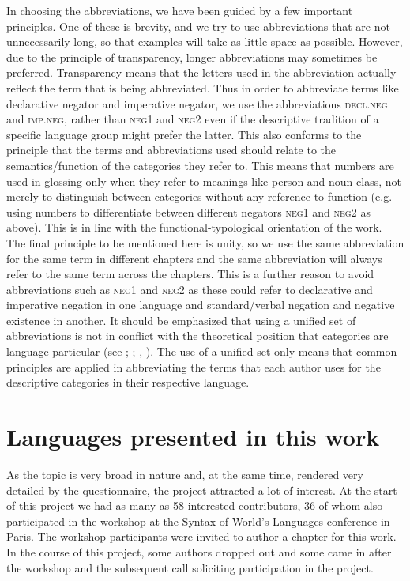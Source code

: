 \documentclass[output=paper,colorlinks,citecolor=brown]{langscibook}
\begin{document}
In choosing the abbreviations, we have been guided by a few important principles. One of these is brevity, and we try to use abbreviations that are not unnecessarily long, so that examples will take as little space as possible. However, due to the principle of transparency, longer abbreviations may sometimes be preferred. Transparency means that the letters used in the abbreviation actually reflect the term that is being abbreviated. Thus in order to abbreviate terms like declarative negator and imperative negator, we use the abbreviations \textsc{decl.neg} and \textsc{imp.neg}, rather than \textsc{neg1} and \textsc{neg2} even if the descriptive tradition of a specific language group might prefer the latter. This also conforms to the principle that the terms and abbreviations used should relate to the semantics/function of the categories they refer to. This means that numbers are used in glossing only when they refer to meanings like person and noun class, not merely to distinguish between categories without any reference to function (e.g. using numbers to differentiate between different negators \textsc{neg1} and \textsc{neg2} as above). This is in line with the functional-typological orientation of the work. The final principle to be mentioned here is unity, so we use the same abbreviation for the same term in different chapters and the same abbreviation will always refer to the same term across the chapters. This is a further reason to avoid abbreviations such as \textsc{neg1} and \textsc{neg2} as these could refer to declarative and imperative negation in one language and standard\slash verbal negation and negative existence in another. It should be emphasized that using a unified set of abbreviations is not in conflict with the theoretical position that categories are language-particular (see \cite{Lazard1992}; \cite{Dryer1997universal}; \cite{Haspelmath2007}, \citeyear{Haspelmath2010}). The use of a unified set only means that common principles are applied in abbreviating the terms that each author uses for the descriptive categories in their respective language.



\section{Languages presented in this work}\label{section3:languages}

As the topic is very broad in nature and, at the same time, rendered very detailed by the questionnaire, the project attracted a lot of interest. At the start of this project we had as many as 58 interested contributors, 36 of whom also participated in the workshop at the Syntax of World's Languages conference in Paris. The workshop participants were invited to author a chapter for this work. In the course of this project, some authors dropped out and some came in after the workshop and the subsequent call soliciting participation in the project. 
\end{document}
